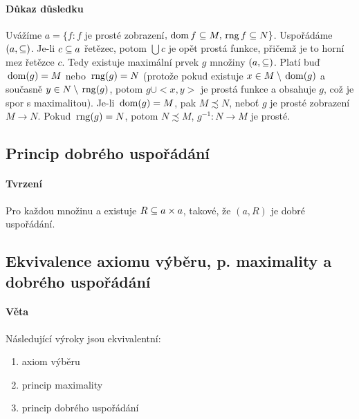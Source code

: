 \documentclass[a4paper,12pt,titlepage]{article}
\begin{document}
\paragraph{Důkaz důsledku}
Uvážíme $a = \{ f: f$ je prosté zobrazení$, \operatorname*{\,dom} f \subseteq M, \operatorname*{\,rng} f \subseteq N
\}$. Uspořádáme $(a, \subseteq)$. Je-li $c \subseteq a$ řetězec, potom $\bigcup c$
je opět prostá funkce, přičemž je to horní mez řetězce $c$. Tedy existuje
maximální prvek $g$ množiny $(a,\subseteq)$. Platí buď $\operatorname*{\,dom}(g) = M$ nebo $\operatorname*{\,rng}(g) =
N$ (protože pokud existuje $x \in M \setminus \operatorname*{\,dom}(g)$ a současně $y \in N \setminus
\operatorname*{\,rng}(g)$, potom $g \cup <x,y>$ je prostá funkce a obsahuje $g$, což je spor s
maximalitou). Je-li $\operatorname*{\,dom}(g) = M$, pak $M \precsim N$, neboť $g$ je prosté
zobrazení $M \to N$. Pokud $\operatorname*{\,rng}(g) = N$, potom $N \precsim M$, $g^{-1}: N \to
M$ je prosté.


\subsection{Princip dobrého uspořádání}
\setcounter{equation}{0}
\paragraph{Tvrzení}
Pro každou množinu a existuje $R \subseteq a \times a$, takové, že $(a, R)$ je dobré uspořádání.

\subsection{Ekvivalence axiomu výběru, p. maximality a dobrého uspořádání}
\setcounter{equation}{0}
\paragraph{Věta}
Následující výroky jsou ekvivalentní:
\begin{enumerate}
	\item axiom výběru
	\item princip maximality
	\item princip dobrého uspořádání
\end{enumerate}
\end{document}
